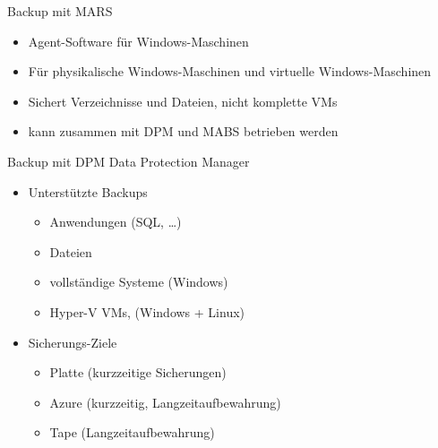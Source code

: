 \begin{flashcard}[Definition]{Backup mit MARS}
    \begin{itemize}
        \item Agent-Software für Windows-Maschinen
        \item Für physikalische Windows-Maschinen und virtuelle Windows-Maschinen
        \item Sichert Verzeichnisse und Dateien, nicht komplette VMs
        \item kann zusammen mit DPM und MABS betrieben werden
    \end{itemize}
\end{flashcard}

\begin{flashcard}[Definition]{Backup mit DPM}
    Data Protection Manager
    \begin{itemize}
        \item Unterstützte Backups
            \begin{itemize}
                \item Anwendungen (SQL, \ldots)
                \item Dateien
                \item vollständige Systeme (Windows)
                \item Hyper-V VMs, (Windows + Linux)
            \end{itemize}
        \item Sicherungs-Ziele
            \begin{itemize}
                \item Platte (kurzzeitige Sicherungen)
                \item Azure (kurzzeitig, Langzeitaufbewahrung)
                \item Tape (Langzeitaufbewahrung)
            \end{itemize}
    \end{itemize}
\end{flashcard}

